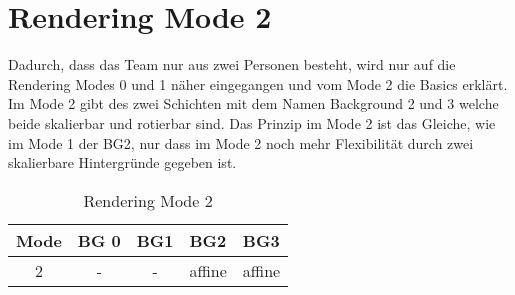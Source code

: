 \chapter{Rendering Mode 2}
Dadurch, dass das Team nur aus zwei Personen besteht, wird nur auf die Rendering Modes 0 und 1 näher eingegangen und vom Mode 2 die Basics erklärt. \\
Im Mode 2 gibt des zwei Schichten mit dem Namen Background 2 und 3 welche beide skalierbar und rotierbar sind.
Das Prinzip im Mode 2 ist das Gleiche, wie im Mode 1 der BG2, nur dass im Mode 2 noch mehr Flexibilität durch zwei skalierbare Hintergründe gegeben ist. \\
\begin{table}[h]
\centering
\begin{tabular}{|l|l|l|l|l|}
\hline
\textbf{Mode}           & \textbf{BG 0}          & \textbf{BG1}           & \textbf{BG2}                & \textbf{BG3}                \\ \hline
\multicolumn{1}{|c|}{2} & \multicolumn{1}{c|}{-} & \multicolumn{1}{c|}{-} & \multicolumn{1}{c|}{affine} & \multicolumn{1}{c|}{affine} \\ \hline
\end{tabular}
\caption{Rendering Mode 2}
\label{Rendering Mode 2}
\end{table}



